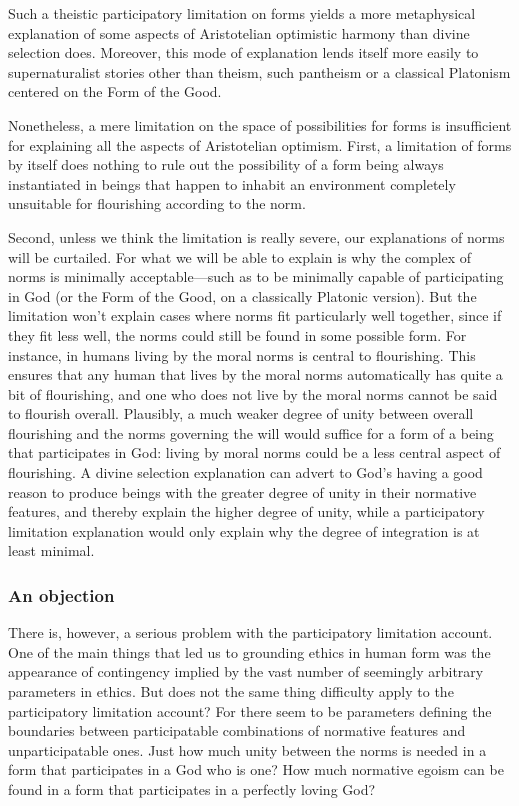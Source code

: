 Such a theistic participatory limitation on forms yields a more metaphysical explanation of some aspects of Aristotelian optimistic harmony than 
divine selection does. Moreover, this mode of explanation lends itself more easily to supernaturalist stories other than theism, 
such pantheism or a classical Platonism centered on the Form of the Good. 

Nonetheless, a mere limitation on the space of possibilities for forms is insufficient for explaining all the aspects of Aristotelian 
optimism. First, a limitation of forms by itself does nothing to rule out the possibility of a form being always instantiated in beings 
that happen to inhabit an environment completely unsuitable for flourishing according to the norm. 

Second, unless we think the limitation is really severe, our explanations of norms will be curtailed. For what we will be able to explain
is why the complex of norms is minimally acceptable---such as to be minimally capable of participating in God (or the Form of the Good,
on a classically Platonic version). But the limitation won't explain cases where norms fit particularly well together, since if they 
fit less well, the norms could still be found in some possible form. For instance, in humans living by the moral norms is central to  
flourishing. This ensures that any human that lives by the moral norms automatically has quite a bit of flourishing, and one who 
does not live by the moral norms cannot be said to flourish overall. Plausibly, a much weaker degree of unity between overall flourishing
and the norms governing the will would suffice for a form of a being that participates in God: living by moral norms could be a less
central aspect of flourishing. A divine selection explanation can advert to God's having a good reason to produce beings with the greater 
degree of unity in their normative features, and thereby explain the higher degree of unity, while a participatory limitation explanation
would only explain why the degree of integration is at least minimal.

\subsubsection{An objection}\label{sec:limited-pl}
There is, however, a serious problem with the participatory limitation account. One of the main things that led us to grounding ethics
in human form was the appearance of contingency implied by the vast number of seemingly arbitrary parameters in ethics. But does not 
the same thing difficulty apply to the participatory limitation account? For there seem to be parameters defining the boundaries between
participatable combinations of normative features and unparticipatable ones. Just how much unity between the norms is needed in a form
that participates in a God who is one? How much normative egoism can be found in a form that participates in a perfectly loving God?

